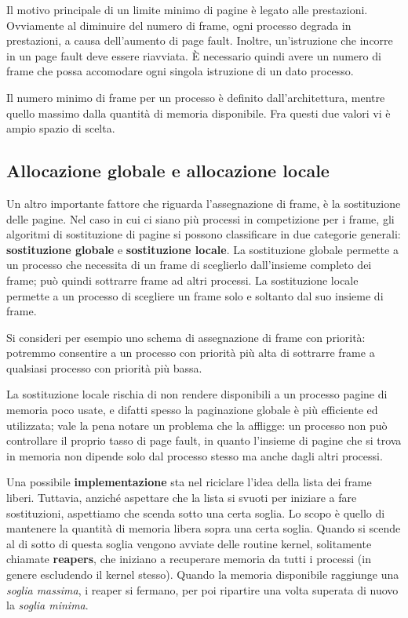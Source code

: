         Il motivo principale di un limite minimo di pagine è legato alle prestazioni. Ovviamente al diminuire del numero di frame, ogni processo degrada in prestazioni, a causa dell'aumento di page fault. Inoltre, un'istruzione che incorre in un page fault deve essere riavviata. È necessario quindi avere un numero di frame che possa accomodare ogni singola istruzione di un dato processo.
        
        Il numero minimo di frame per un processo è definito dall'architettura, mentre quello massimo dalla quantità di memoria disponibile. Fra questi due valori vi è ampio spazio di scelta.
    
    \subsection{Allocazione globale e allocazione locale}
        Un altro importante fattore che riguarda l'assegnazione di frame, è la sostituzione delle pagine. Nel caso in cui ci siano più processi in competizione per i frame, gli algoritmi di sostituzione di pagine si possono classificare in due categorie generali: \textbf{sostituzione globale} e \textbf{sostituzione locale}. La sostituzione globale permette a un processo che necessita di un frame di sceglierlo dall'insieme completo dei frame; può quindi sottrarre frame ad altri processi. La sostituzione locale permette a un processo di scegliere un frame solo e soltanto dal suo insieme di frame.
        
        Si consideri per esempio uno schema di assegnazione di frame con priorità: potremmo consentire a un processo con priorità più alta di sottrarre frame a qualsiasi processo con priorità più bassa.
        
        La sostituzione locale rischia di non rendere disponibili a un processo pagine di memoria poco usate, e difatti spesso la paginazione globale è più efficiente ed utilizzata; vale la pena notare un problema che la affligge: un processo non può controllare il proprio tasso di page fault, in quanto l'insieme di pagine che si trova in memoria non dipende solo dal processo stesso ma anche dagli altri processi.
        
        Una possibile \textbf{implementazione} sta nel riciclare l'idea della lista dei frame liberi. Tuttavia, anziché aspettare che la lista si svuoti per iniziare a fare sostituzioni, aspettiamo che scenda sotto una certa soglia. Lo scopo è quello di mantenere la quantità di memoria libera sopra una certa soglia. Quando si scende al di sotto di questa soglia vengono avviate delle routine kernel, solitamente chiamate \textbf{reapers}, che iniziano a recuperare memoria da tutti i processi (in genere escludendo il kernel stesso). Quando la memoria disponibile raggiunge una \textit{soglia massima}, i reaper si fermano, per poi ripartire una volta superata di nuovo la \textit{soglia minima}.
        
